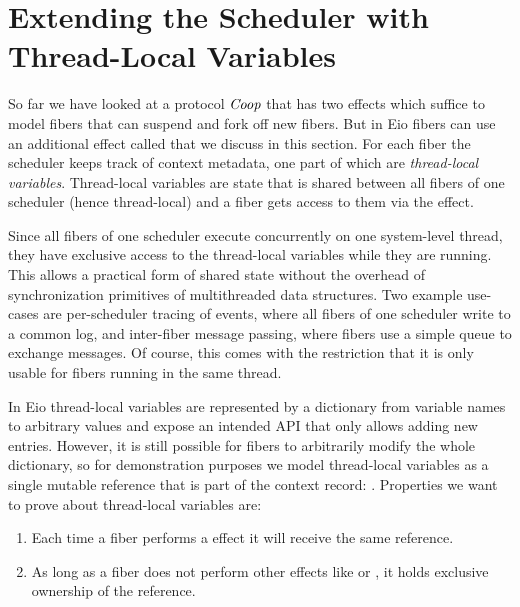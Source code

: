\section{Extending the Scheduler with Thread-Local Variables}
\label{sec:thread-local-vars}


So far we have looked at a protocol \(\emph{Coop}{}\) that has two effects which suffice to model fibers that can suspend and fork off new fibers.
But in Eio fibers can use an additional effect called \egetctx{} that we discuss in this section.
For each fiber the scheduler keeps track of context metadata, one part of which are \emph{thread-local variables}.
Thread-local variables are state that is shared between all fibers of one scheduler (hence thread-local) and a fiber gets access to them via the \egetctx{} effect.


Since all fibers of one scheduler execute concurrently on one system-level thread, they have exclusive access to the thread-local variables while they are running.
This allows a practical form of shared state without the overhead of synchronization primitives of multithreaded data structures.
Two example use-cases are per-scheduler tracing of events, where all fibers of one scheduler write to a common log,
and inter-fiber message passing, where fibers use a simple queue to exchange messages.
Of course, this comes with the restriction that it is only usable for fibers running in the same thread.


In Eio thread-local variables are represented by a dictionary from variable names to arbitrary values and expose an intended API that only allows adding new entries.
However, it is still possible for fibers to arbitrarily modify the whole dictionary, so for demonstration purposes we model thread-local variables as a single mutable reference that is part of the context record: .
Properties we want to prove about thread-local variables are:
\begin{enumerate}
  \item Each time a fiber performs a \egetctx{} effect it will receive the same reference.
  \item As long as a fiber does not perform other effects like \efork{} or \esuspend{}, it holds exclusive ownership of the reference.
\end{enumerate}

